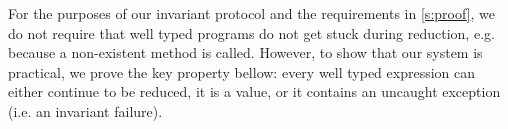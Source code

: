 
For the purposes of our invariant protocol and the requirements in \autoref{s:proof}, we do not require that well typed programs do not get stuck during reduction, e.g. because a non-existent method is called.
However, to show that our system is practical, we prove the key property bellow:
every well typed expression can either continue to be reduced, it is a value, or it contains an uncaught exception (i.e. an invariant failure).

